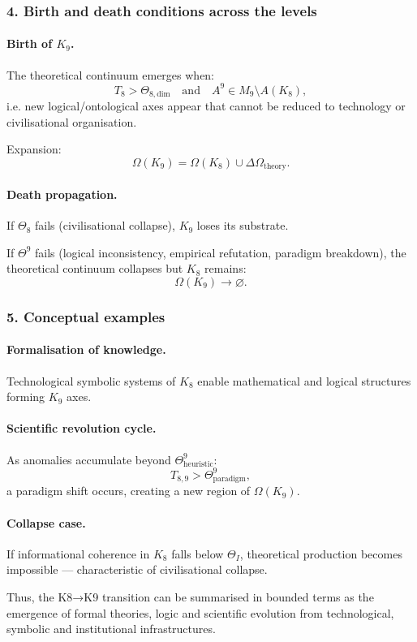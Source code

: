 \subsubsection{4. Birth and death conditions across the levels}

\paragraph{Birth of \texorpdfstring{$K_9$}{K_9}.}
The theoretical continuum emerges when:
\[
T_8 > \Theta_{8,\mathrm{dim}}
\quad\text{and}\quad
A^9 \in M_9 \setminus A(K_8),
\]
i.e. new logical/ontological axes appear that cannot be reduced to
technology or civilisational organisation.

Expansion:
\[
\Omega(K_9) = \Omega(K_8) \cup \Delta\Omega_{\mathrm{theory}}.
\]

\paragraph{Death propagation.}
If $\Theta_8$ fails (civilisational collapse), $K_9$ loses its substrate.

If $\Theta^9$ fails (logical inconsistency, empirical refutation,
paradigm breakdown), the theoretical continuum collapses but $K_8$ remains:
\[
\Omega(K_9) \rightarrow \varnothing.
\]

\subsubsection{5. Conceptual examples}

\paragraph{Formalisation of knowledge.}
Technological symbolic systems of $K_8$ enable mathematical and logical
structures forming $K_9$ axes.

\paragraph{Scientific revolution cycle.}
As anomalies accumulate beyond $\Theta^9_{\mathrm{heuristic}}$:
\[
T_{8,9} > \Theta^9_{\mathrm{paradigm}},
\]
a paradigm shift occurs, creating a new region of $\Omega(K_9)$.

\paragraph{Collapse case.}
If informational coherence in $K_8$ falls below $\Theta_I$, theoretical
production becomes impossible — characteristic of civilisational collapse.

Thus, the K8→K9 transition can be summarised in bounded terms as the
emergence of formal theories, logic and scientific evolution from
technological, symbolic and institutional infrastructures.

